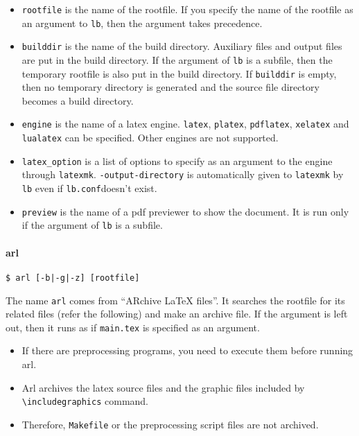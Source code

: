 \begin{itemize}
\tightlist
\item
  \texttt{rootfile} is the name of the rootfile. If you specify the name
  of the rootfile as an argument to \texttt{lb}, then the argument takes
  precedence.
\item
  \texttt{builddir} is the name of the build directory. Auxiliary files
  and output files are put in the build directory. If the argument of
  \texttt{lb} is a subfile, then the temporary rootfile is also put in
  the build directory. If \texttt{builddir} is empty, then no temporary
  directory is generated and the source file directory becomes a build
  directory.
\item
  \texttt{engine} is the name of a latex engine. \texttt{latex},
  \texttt{platex}, \texttt{pdflatex}, \texttt{xelatex} and
  \texttt{lualatex} can be specified. Other engines are not supported.
\item
  \texttt{latex\_option} is a list of options to specify as an argument
  to the engine through \texttt{latexmk}. \texttt{-output-directory} is
  automatically given to \texttt{latexmk} by \texttt{lb} even if
  \texttt{lb.conf}doesn't exist.
\item
  \texttt{preview} is the name of a pdf previewer to show the document.
  It is run only if the argument of \texttt{lb} is a subfile.
\end{itemize}

\hypertarget{arl}{%
\paragraph{arl}\label{arl}}

\begin{verbatim}
$ arl [-b|-g|-z] [rootfile]
\end{verbatim}

The name \texttt{arl} comes from ``ARchive LaTeX files''. It searches
the rootfile for its related files (refer the following) and make an
archive file. If the argument is left out, then it runs as if
\texttt{main.tex} is specified as an argument.

\begin{itemize}
\tightlist
\item
  If there are preprocessing programs, you need to execute them before
  running arl.
\item
  Arl archives the latex source files and the graphic files included by
  \texttt{\textbackslash{}includegraphics} command.
\item
  Therefore, \texttt{Makefile} or the preprocessing script files are not
  archived.
\end{itemize}

